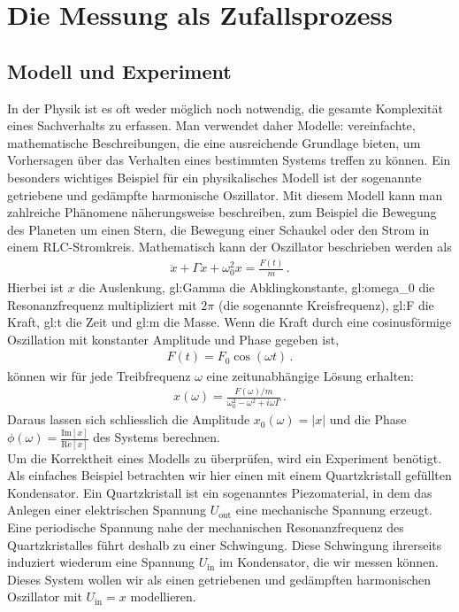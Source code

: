 \chapter{Die Messung als Zufallsprozess}
\label{chap:fehler}

\section{Modell und Experiment}
\label{chap:fehler:sec:modell}

In der Physik ist es oft weder möglich noch notwendig, die gesamte Komplexität eines Sachverhalts zu erfassen. Man verwendet daher Modelle: vereinfachte, mathematische Beschreibungen, die eine ausreichende Grundlage bieten, um  Vorhersagen über das Verhalten eines bestimmten Systems treffen zu können. Ein besonders wichtiges Beispiel für ein physikalisches Modell ist der sogenannte getriebene und gedämpfte harmonische Oszillator. Mit diesem Modell kann man zahlreiche Phänomene näherungsweise beschreiben, zum Beispiel die Bewegung des Planeten um einen Stern, die Bewegung einer Schaukel oder den Strom in einem RLC-Stromkreis. Mathematisch kann der Oszillator beschrieben  werden als 
\begin{align}
\ddot{x} + \Gamma \dot{x} + \omega_0^2 x = \frac{F ( t )}{m}\,.
\end{align}
Hierbei ist $x$ die Auslenkung, \gls{gl:Gamma} die Abklingkonstante, \gls{gl:omega_0} die Resonanzfrequenz multipliziert mit $2\pi$ (die sogenannte Kreisfrequenz), \gls{gl:F} die Kraft, \gls{gl:t} die Zeit und \gls{gl:m} die Masse. Wenn die Kraft durch eine cosinusförmige Oszillation mit konstanter Amplitude und Phase gegeben ist,
\begin{align}
F(t) = F_0 \cos(\omega t)\,.
\end{align}
können wir für jede Treibfrequenz $\omega$ eine zeitunabhängige Lösung erhalten:
\begin{align}
x(\omega) = \frac{F(\omega)/m}{\omega_0^2-\omega^2+i\omega\Gamma}\,.
\end{align}
Daraus lassen sich schliesslich die Amplitude $x_0(\omega) = \lvert x \rvert$ und die Phase $\phi(\omega) = \frac{\mathrm{Im}[x]}{\mathrm{Re}[x]}$ des Systems berechnen. \\

Um die Korrektheit eines Modells zu überprüfen, wird ein Experiment benötigt. Als einfaches Beispiel betrachten wir hier einen mit einem Quartzkristall gefüllten Kondensator. Ein Quartzkristall ist ein sogenanntes Piezomaterial, in dem das Anlegen einer elektrischen Spannung $U_{\mathrm{out}}$ eine mechanische Spannung erzeugt. Eine periodische Spannung nahe der mechanischen Resonanzfrequenz des Quartzkristalles führt deshalb zu einer Schwingung. Diese Schwingung ihrerseits induziert wiederum eine Spannung $U_{\mathrm{in}}$ im Kondensator, die wir messen können. Dieses System wollen wir als einen getriebenen und gedämpften harmonischen Oszillator mit $U_{\mathrm{in}} = x$ modellieren. \\

